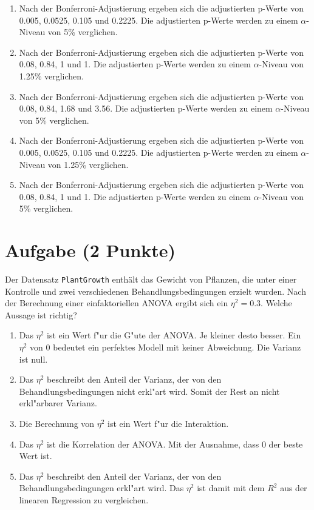 \documentclass[a4paper, 9pt]{scrartcl}\usepackage[]{graphicx}\usepackage[]{xcolor}
\begin{document}
\begin{enumerate}
\item [\textbf{A} \msquare] Nach der Bonferroni-Adjustierung ergeben sich die adjustierten p-Werte von 0.005, 0.0525, 0.105 und 0.2225. Die adjustierten p-Werte werden zu einem $\alpha$-Niveau von 5\% verglichen.
\item [\textbf{B} \msquare] Nach der Bonferroni-Adjustierung ergeben sich die adjustierten p-Werte von 0.08, 0.84, 1 und 1. Die adjustierten p-Werte werden zu einem $\alpha$-Niveau von 1.25\% verglichen.
\item [\textbf{C} \msquare] Nach der Bonferroni-Adjustierung ergeben sich die adjustierten p-Werte von 0.08, 0.84, 1.68 und 3.56. Die adjustierten p-Werte werden zu einem $\alpha$-Niveau von 5\% verglichen.
\item [\textbf{D} \msquare] Nach der Bonferroni-Adjustierung ergeben sich die adjustierten p-Werte von 0.005, 0.0525, 0.105 und 0.2225. Die adjustierten p-Werte werden zu einem $\alpha$-Niveau von 1.25\% verglichen.
\item [\textbf{E} \msquare] Nach der Bonferroni-Adjustierung ergeben sich die adjustierten p-Werte von 0.08, 0.84, 1 und 1. Die adjustierten p-Werte werden zu einem $\alpha$-Niveau von 5\% verglichen.
\end{enumerate} 

\section{Aufgabe \hfill (2 Punkte)}



Der Datensatz \texttt{PlantGrowth} enth{\"a}lt das Gewicht von Pflanzen, die
unter einer Kontrolle und zwei verschiedenen Behandlungsbedingungen erzielt
wurden. Nach der Berechnung einer einfaktoriellen ANOVA ergibt sich ein
$\eta^2 = 0.3$. Welche Aussage ist richtig?



\begin{enumerate}
\item [\textbf{A} \msquare] Das $\eta^2$ ist ein Wert f{"u}r die G{"u}te der ANOVA. Je kleiner desto besser. Ein $\eta^2$ von 0 bedeutet ein perfektes Modell mit keiner Abweichung. Die Varianz ist null.
\item [\textbf{B} \msquare] Das $\eta^2$ beschreibt den Anteil der Varianz, der von den Behandlungsbedingungen nicht erkl{"a}rt wird. Somit der Rest an nicht erkl{"a}rbarer Varianz.
\item [\textbf{C} \msquare] Die Berechnung von $\eta^2$ ist ein Wert f{"u}r die Interaktion.
\item [\textbf{D} \msquare] Das $\eta^2$ ist die Korrelation der ANOVA. Mit der Ausnahme, dass 0 der beste Wert ist.
\item [\textbf{E} \msquare] Das $\eta^2$ beschreibt den Anteil der Varianz, der von den Behandlungsbedingungen erkl{"a}rt wird. Das $\eta^2$ ist damit mit dem $R^2$ aus der linearen Regression zu vergleichen.
\end{enumerate} 
\end{document}
